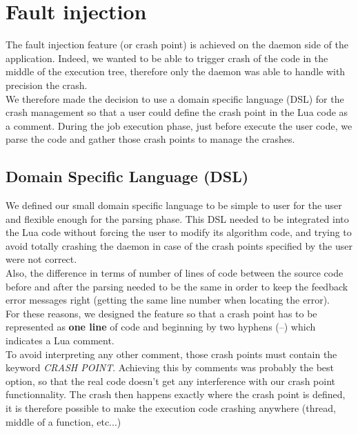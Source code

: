 \documentclass{eplmastersthesis}
\begin{document}
      \section{Fault injection}

        The fault injection feature (or crash point) is achieved on the daemon
        side of the application. Indeed, we wanted to be able to trigger crash
        of the code in the middle of the execution tree, therefore only the
        daemon was able to handle with precision the crash.\\

        We therefore made the decision to use a domain specific language (DSL)
        for the crash management so that a user could define the crash point
        in the Lua code as a comment. During the job execution phase, just before
        execute the user code, we parse the code and gather those crash points to manage the
        crashes.

        \subsection{Domain Specific Language (DSL)}

          We defined our small domain specific language to be simple to user
          for the user and flexible enough for the parsing phase. This DSL
          needed to be integrated into the Lua code without forcing the user to
          modify its algorithm code, and trying to avoid totally crashing
          the daemon in case of the crash points specified by the user were
          not correct.\\
          Also, the difference in terms of number of lines of code between the
          source code before and after the parsing needed to be the same in
          order to keep the feedback error messages right (getting the same line
          number when locating the error).\\

          For these reasons, we designed the feature so that a crash point has
          to be represented as \textbf{one line} of code and beginning by
          two hyphens (--) which indicates a Lua comment.\\
          To avoid interpreting any other comment, those crash points must
          contain the keyword \textit{CRASH POINT}. Achieving this by comments
          was probably the best option, so that the real code doesn't get any
          interference with our crash point functionnality. The crash then
          happens exactly where the crash point is defined, it is therefore
          possible to make the execution code crashing anywhere (thread, middle
          of a function, etc...)\\
\end{document}
